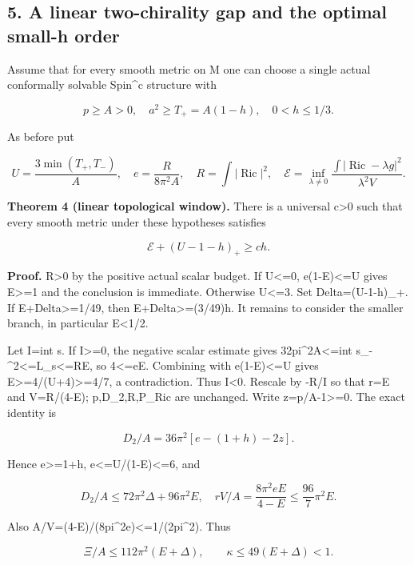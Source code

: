 \documentclass[
  10pt,
]{article}
\begin{document}
\hypertarget{a-linear-two-chirality-gap-and-the-optimal-small-h-order}{%
\subsection{5. A linear two-chirality gap and the optimal small-h
order}\label{a-linear-two-chirality-gap-and-the-optimal-small-h-order}}

Assume that for every smooth metric on M one can choose a single actual
conformally solvable Spin\^{}c structure with

\[
 p\ge A>0,\quad a^2\ge T_+=A(1-h),\quad 0<h\le1/3.
\]

As before put

\[
 U=\frac{3\min(T_+,T_-)}A,\quad
 e=\frac{R}{8\pi^2A},\quad R=\int|\operatorname{Ric}|^2,
 \quad\mathcal E=\inf_{\lambda\ne0}
       \frac{\int|\operatorname{Ric}-\lambda g|^2}{\lambda^2V}.
\]

\textbf{Theorem 4 (linear topological window).} There is a universal
c\textgreater0 such that every smooth metric under these hypotheses
satisfies

\[
              \boxed{\mathcal E+(U-1-h)_+\ge c h.}    \tag{5.1}
\]

\textbf{Proof.} R\textgreater0 by the positive actual scalar budget. If
U\textless=0, e(1-E)\textless=U gives E\textgreater=1 and the conclusion
is immediate. Otherwise U\textless=3. Set Delta=(U-1-h)\_+. If
E+Delta\textgreater=1/49, then E+Delta\textgreater=(3/49)h. It remains
to consider the smaller branch, in particular E\textless1/2.

Let I=int s. If I\textgreater=0, the negative scalar estimate gives
32pi\^{}2A\textless=int s\_-\^{}2\textless=L\_s\textless=RE, so
4\textless=eE. Combining with e(1-E)\textless=U gives
E\textgreater=4/(U+4)\textgreater=4/7, a contradiction. Thus
I\textless0. Rescale by -R/I so that r=E and V=R/(4-E); p,D\_2,R,P\_Ric
are unchanged. Write z=p/A-1\textgreater=0. The exact identity is

\[
          D_2/A=36\pi^2[e-(1+h)-2z].                 \tag{5.2}
\]

Hence e\textgreater=1+h, e\textless=U/(1-E)\textless=6, and

\[
 D_2/A\le72\pi^2\Delta+96\pi^2E,\quad
 rV/A=\frac{8\pi^2eE}{4-E}\le\frac{96}{7}\pi^2E.
\]

Also A/V=(4-E)/(8pi\^{}2e)\textless=1/(2pi\^{}2). Thus

\[
 \Xi/A\le112\pi^2(E+\Delta),\qquad
 \kappa\le49(E+\Delta)<1.                            \tag{5.3}
\]
\end{document}
